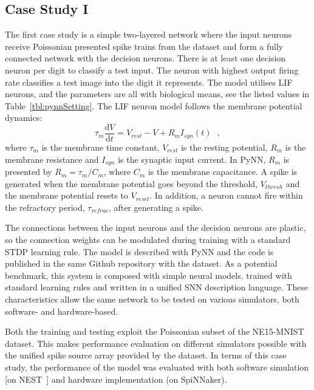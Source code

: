 \documentclass{frontiersENG} %
\def\D{\mathrm{d}}
\begin{document}
\subsection{Case Study I}
The first case study is a simple two-layered network where the input neurons receive Poissonian presented spike trains from the dataset and form a fully connected network with the decision neurons.
There is at least one decision neuron per digit to classify a test input.
The neuron with highest output firing rate classifies a test image into the digit it represents.
The model utilises LIF neurons, and the parameters are all with biological means, see the listed values in Table~\ref{tbl:pynnSetting}.
The LIF neuron model follows the membrane potential
dynamics:
\begin{equation}
\tau_m \frac{\D V}{\D t}=V_{rest} - V + R_{m} I_{syn}(t) ~~~,
\label{eq:LIF}
\end{equation}
where $\tau_m$ is the membrane time constant, $ V_{rest} $ is the resting potential, $ R_{m} $ is the membrane resistance and $ I_{syn} $ is the synaptic input current.
In PyNN, $ R_{m} $ is presented by $ R_{m}=\tau_m/C_{m} $, where $C_{m} $ is the membrane capacitance.
A spike is generated when the membrane potential goes beyond the threshold, $ V_{thresh} $ and the membrane potential resets to $V_{reset}$.
In addition, a neuron cannot fire within the refractory period, $ \tau_{refrac} $, after generating a spike.

The connections between the input neurons and the decision neurons are plastic, so the connection weights can be modulated during training with a standard STDP learning rule.
The model is described with PyNN and the code is published in
the same Github repository with the dataset.
As a potential benchmark, this system is composed with simple neural models, trained with standard learning rules and written in a unified SNN description language. These characteristics allow the same network to be tested on various simulators, both software- and hardware-based.

Both the training and testing exploit the Poissonian subset of the NE15-MNIST dataset.
This makes performance evaluation on different simulators possible with the unified spike source array provided by the dataset. 
In terms of this case study, the performance of the model was evaluated with both software simulation [on NEST~\citep{gewaltig2007nest}] and hardware implementation (on SpiNNaker).
\end{document}
